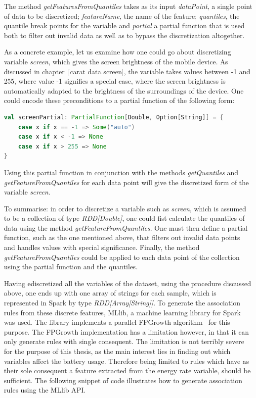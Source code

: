 The method \textit{getFeaturesFromQuantiles} takes as its input \textit{dataPoint}, a single point of data to be discretized; \textit{featureName}, the name of the feature; \textit{quantiles}, the quantile break points for the variable and \textit{partial} a partial function that is used both to filter out invalid data as well as to bypass the discretization altogether.

As a concrete example, let us examine how one could go about discretizing variable \textit{screen}, which gives the screen brightness of the mobile device. As discussed in chapter~\ref{carat data screen}, the variable takes values between -1 and 255, where value -1 signifies a special case, where the screen brightness is automatically adapted to the brightness of the surroundings of the device. One could encode these preconditions to a partial function of the following form:
\begin{minipage}{\linewidth}
\begin{lstlisting}[language=scala] 
val screenPartial: PartialFunction[Double, Option[String]] = {
    case x if x == -1 => Some("auto")
    case x if x < -1 => None
	case x if x > 255 => None
}
\end{lstlisting}
\end{minipage} 
Using this partial function in conjunction with the methods \textit{getQuantiles} and \textit{getFeatureFromQuantiles} for each data point will give the discretized form of the variable \textit{screen}. 

To summarise: in order to discretize a variable such as \textit{screen}, which is assumed to be a collection of type \textit{RDD[Double]}, one could fist calculate the quantiles of data using the method \textit{getFeatureFromQuantiles}. One must then define a partial function, such as the one mentioned above, that filters out invalid data points and handles values with special significance. Finally, the method \textit{getFeatureFromQuantiles} could be applied to each data point of the collection using the partial function and the quantiles.

Having ediscretized all the variables of the dataset, using the procedure discussed above, one ends up with one array of strings for each sample, which is represented in Spark by type \textit{RDD[Array[String]]}. To generate the association rules from these discrete features, MLlib, a machine learning library for Spark was used. The library implements a parallel FPGrowth algorithm~\cite{Li:2008:PPF:1454008.1454027} for this purpose. The FPGrowth implementation has a limitation however, in that it can only generate rules with single consequent. The limitation is not terribly severe for the purpose of this thesis, as the main interest lies in finding out which variables affect the battery usage. Therefore being limited to rules which have as their sole consequent a feature extracted from the energy rate variable, should be sufficient. The following snippet of code illustrates how to generate association rules using the MLlib API.

